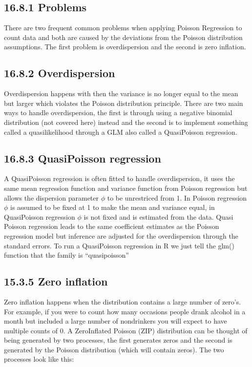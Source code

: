 \documentclass[letterpaper,10pt,english]{jupyterBook}
\begin{document}
\subsection{16.8.1 Problems}
\label{\detokenize{16.i. Generalised Linear Model (GLM):problems}}
\sphinxAtStartPar
There are two frequent common problems when applying Poisson Regression to count data and both are caused by the deviations from the Poisson distribution assumptions. The first problem is overdispersion and the second is zero inflation.


\subsection{16.8.2 Overdispersion}
\label{\detokenize{16.i. Generalised Linear Model (GLM):overdispersion}}
\sphinxAtStartPar
Overdispersion happens with then the variance is no longer equal to the mean but larger which violates the Poisson distribution principle. There are two main ways to handle overdispersion, the first is through using a negative binomial distribution (not covered here) instead and the second is to implement something called a quasi\sphinxhyphen{}likelihood through a GLM also called a Quasi\sphinxhyphen{}Poisson regression.


\subsection{16.8.3 Quasi\sphinxhyphen{}Poisson regression}
\label{\detokenize{16.i. Generalised Linear Model (GLM):quasi-poisson-regression}}
\sphinxAtStartPar
A Quasi\sphinxhyphen{}Poisson regression is often fitted to handle over\sphinxhyphen{}dispersion, it uses the same mean regression function and variance function from Poisson regression but allows the dispersion parameter \(\phi\) to be unrestriced from 1. In Poisson regression \(\phi\) is assumed to be fixed at 1 to make the mean and variance equal, in Quasi\sphinxhyphen{}Poisson regression \(\phi\) is not fixed and is estimated from the data. Quasi\sphinxhyphen{} Poisson regression leads to the same coefficient estimates as the Poisson regression model but inference are adjusted for the over\sphinxhyphen{}dispersion through the standard errors. To run a Quasi\sphinxhyphen{}Poisson regression in R we just tell the glm() function that the family is “quasipoisson”


\subsection{15.3.5 Zero inflation}
\label{\detokenize{16.i. Generalised Linear Model (GLM):zero-inflation}}
\sphinxAtStartPar
Zero inflation happens when the distribution contains a large number of zero’s. For example, if you were to count how many occasions people drank alcohol in a month but included a large number of non\sphinxhyphen{}drinkers you will expect to have multiple counts of 0. A Zero\sphinxhyphen{}Inflated Poisson (ZIP) distribution can be thought of being generated by two processes, the first generates zeros and the second is generated by the Poisson distribution (which will contain zeros). The two processes look like this:
\end{document}
